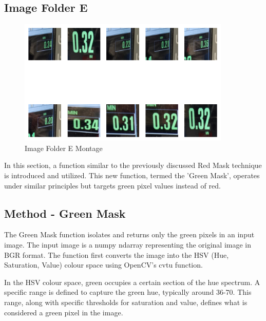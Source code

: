 \newpage

\subsection{Image Folder E}

\begin{figure}[ht]
    \centering
    \includegraphics[width=0.9\textwidth]{Figures/EDA_Charts/7/montage.png}
    \caption[Image Folder E Montage]{Image Folder E Montage}
    \label{fig:Image Folder E Montage}
\end{figure}

In this section, a function similar to the previously discussed Red Mask technique is introduced and utilized. This new function, termed the 'Green Mask', operates under similar principles but targets green pixel values instead of red.

\subsection*{Method - Green Mask}

The Green Mask function isolates and returns only the green pixels in an input image. The input image is a numpy ndarray representing the original image in BGR format. The function first converts the image into the HSV (Hue, Saturation, Value) colour space using OpenCV's cvtu function.

In the HSV colour space, green occupies a certain section of the hue spectrum. A specific range is defined to capture the green hue, typically around 36-70. This range, along with specific thresholds for saturation and value, defines what is considered a green pixel in the image.

